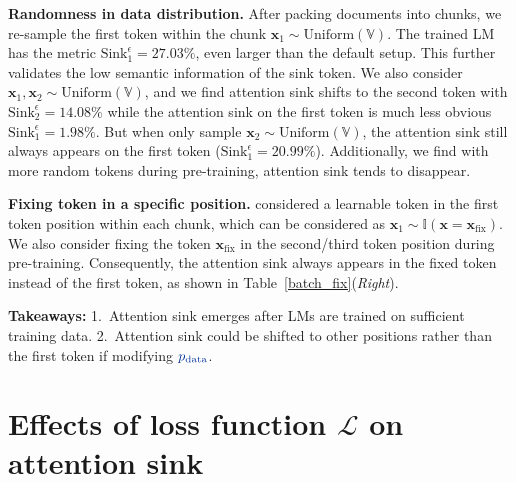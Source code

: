 \documentclass{article} \usepackage{iclr2025_conference,times}
\begin{document}
\textbf{Randomness in data distribution.} After packing documents into chunks, we re-sample the first token within the chunk $\boldsymbol{x}_1\sim \textrm{Uniform}(\mathbb{V})$. The trained LM has the metric $\textrm{Sink}_1^\epsilon=\textrm{27.03\%}$, even larger than the default setup. This further validates the low semantic information of the sink token. We also consider $\boldsymbol{x}_1\textrm{,}\,\boldsymbol{x}_2\sim \textrm{Uniform}(\mathbb{V})$, and we find attention sink shifts to the second token with $\textrm{Sink}_2^\epsilon=\textrm{14.08\%}$ while the attention sink on the first token is much less obvious $\textrm{Sink}_1^\epsilon=\textrm{1.98\%}$. But when only sample $\boldsymbol{x}_2\sim \textrm{Uniform}(\mathbb{V})$, the attention sink still always appears on the first token ($\textrm{Sink}_1^\epsilon=\textrm{20.99\%}$). Additionally, we find with more random tokens during pre-training, attention sink tends to disappear.

\textbf{Fixing token in a specific position.} \citet{xiao2023efficient} considered a learnable token in the first token position within each chunk, which can be considered as $\boldsymbol{x}_1\sim \mathbb{I}(\boldsymbol{x}=\boldsymbol{x}_{\textrm{fix}})$. We also consider fixing the token $\boldsymbol{x}_{\textrm{fix}}$ in the second/third token position during pre-training. Consequently, the attention sink always appears in the fixed token instead of the first token, as shown in Table~\ref{batch_fix}(\emph{Right}).

\vspace{-0.1cm}
\begin{abox}  \textbf{Takeaways:} 1.~Attention sink emerges after LMs are trained on sufficient training data. 2.~Attention sink could be shifted to other positions rather than the first token if modifying $\color{cc2} p_{\textrm{data}}$.\end{abox}










 


\vspace{-0.2cm}
\section{Effects of {\color{cc3}loss function \texorpdfstring{$\mathcal{L}$}{TEXT}} on attention sink}
\vspace{-0.2cm}
\label{sec6}
\end{document}
